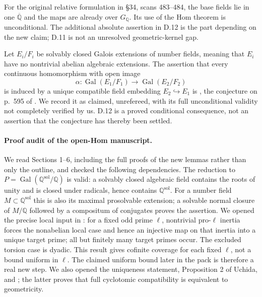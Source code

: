 For the original relative formulation in \S34, scans 483--484, the base
fields lie in one $\overline{\mathbb Q}$ and the maps are already over
$G_{\mathbb Q}$.  Its use of the Hom theorem is unconditional.  The additional
absolute assertion in D.12 is the part depending on the new claim; D.11 is
not an unresolved geometric-kernel gap.

Let $E_i/F_i$ be solvably closed Galois extensions of number fields, meaning
that $E_i$ have no nontrivial abelian algebraic extensions.  The assertion
that every continuous homomorphism with open image
\[
 \alpha:\operatorname{Gal}(E_1/F_1)\longrightarrow
                \operatorname{Gal}(E_2/F_2)
\]
is induced by a unique compatible field embedding $E_2\hookrightarrow E_1$
is \citet[Theorem 1.1]{OpenAI031}, the conjecture on p.~595 of
\citet{Uchida1981}.  We record it as claimed, unrefereed, with its full
unconditional validity not completely verified by us.  D.12 is a proved
conditional consequence, not an assertion that the conjecture has thereby
been settled.

\paragraph{Proof audit of the open-Hom manuscript.}
We read Sections 1--6, including the full proofs of the new lemmas rather
than only the outline, and checked the following dependencies.
The reduction to $P=\operatorname{Gal}(\mathbb Q^{\mathrm{sol}}/\mathbb Q)$
is valid: a solvably closed algebraic field contains the roots of unity and
is closed under radicals, hence contains $\mathbb Q^{\mathrm{sol}}$.
For a number field $M\subset\mathbb Q^{\mathrm{sol}}$ this is also its maximal
prosolvable extension; a solvable normal closure of $M/\mathbb Q$ followed by
a compositum of conjugates proves the assertion.
We opened the precise local input in \citet[Section 1, pp.~595--597 and
Proposition 1]{Uchida1981}: for a fixed odd prime $\ell$, nontrivial
pro-$\ell$ inertia forces the nonabelian local case and hence an injective
map on that inertia into a unique target prime; all but finitely many target
primes occur.  The excluded torsion case is dyadic.  This result gives
cofinite coverage for each fixed $\ell$, not a bound uniform in $\ell$.
The claimed uniform bound later in the pack is therefore a real new step.
We also opened the uniqueness statement, Proposition 2 of Uchida, and
\citet[Theorem 3.4]{Hoshi2025}; the latter proves that full cyclotomic
compatibility is equivalent to geometricity.


